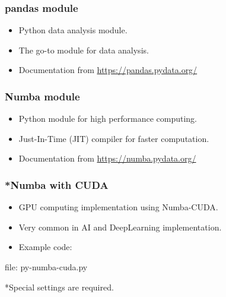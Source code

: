 
\begin{frame}[fragile]
\frametitle{pandas module}

\begin{itemize}
\item Python data analysis module.
\item The go-to module for data analysis.
\item Documentation from \url{https://pandas.pydata.org/}
\end{itemize}

\end{frame}


\begin{frame}[fragile]
\frametitle{Numba module}

\begin{itemize}
\item Python module for high performance computing.
\item Just-In-Time (JIT) compiler for faster computation.
\item Documentation from \url{https://numba.pydata.org/}
\end{itemize}

%

\end{frame}


\begin{frame}[fragile]
\frametitle{*Numba with CUDA}

\begin{itemize}
\item GPU computing implementation using Numba-CUDA.
\item Very common in AI and DeepLearning implementation.
\item Example code:
\end{itemize}

\newcommand{\newfilename}{py-numba-cuda.py}

file: \newfilename

*Special settings are required.
\end{frame}


